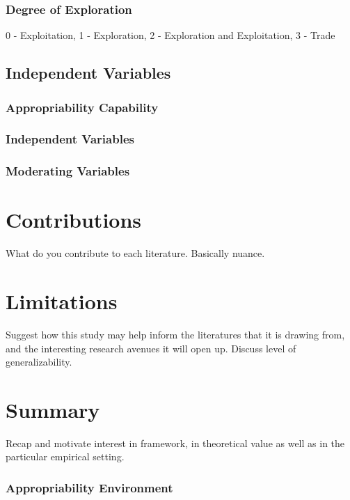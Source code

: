 \documentclass[12pt,letterpaper]{article}
\begin{document}
\subsubsection{Degree of Exploration} \par
0 - Exploitation, 1 - Exploration, 2 - Exploration and Exploitation, 3 - Trade \par
\subsection{Independent Variables}
\subsubsection{Appropriability Capability}
\subsubsection{Independent Variables}

\subsubsection{Moderating Variables}

\section{Contributions}
What do you contribute to each literature. Basically nuance. 

\section{Limitations}
Suggest how this study may help inform the literatures that it is drawing from, and the interesting research avenues it will open up. Discuss level of generalizability.

\section{Summary}
Recap and motivate interest in framework, in theoretical value as well as in the particular empirical setting.

\subsubsection{Appropriability Environment}
\renewcommand{\refname}{REFERENCES}
 

\end{document}
